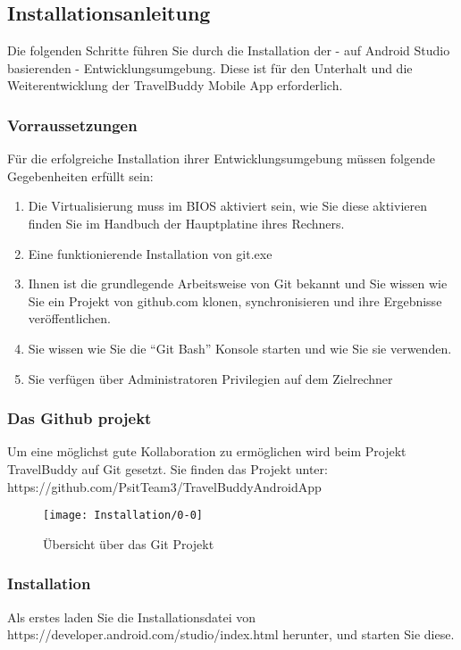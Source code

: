 \subsection{Installationsanleitung}
Die folgenden Schritte führen Sie durch die Installation der - auf Android Studio basierenden - Entwicklungsumgebung. Diese ist für den Unterhalt und die Weiterentwicklung der TravelBuddy Mobile App erforderlich.

\subsubsection{Vorraussetzungen}
Für die erfolgreiche Installation ihrer Entwicklungsumgebung müssen folgende Gegebenheiten erfüllt sein:
\begin{enumerate}
  \item Die Virtualisierung muss im BIOS aktiviert sein, wie Sie diese aktivieren finden Sie im Handbuch der Hauptplatine ihres Rechners.
  \item Eine funktionierende Installation von git.exe
  \item Ihnen ist die grundlegende Arbeitsweise von Git bekannt und Sie wissen wie Sie ein Projekt von github.com klonen, synchronisieren und ihre Ergebnisse veröffentlichen.
  \item Sie wissen wie Sie die ``Git Bash'' Konsole starten und wie Sie sie verwenden.
  \item Sie verfügen über Administratoren Privilegien auf dem Zielrechner
\end{enumerate}

\subsubsection{Das Github projekt}
Um eine möglichst gute Kollaboration zu ermöglichen wird beim Projekt TravelBuddy auf Git gesetzt.
Sie finden das Projekt unter: https://github.com/PsitTeam3/TravelBuddyAndroidApp
\begin{figure}
  \centering
  \texttt{[image: Installation/0-0]}
  \caption{Übersicht über das Git Projekt}
\end{figure}

\subsubsection{Installation}


Als erstes laden Sie die Installationsdatei von https://developer.android.com/studio/index.html herunter, und starten Sie diese.


